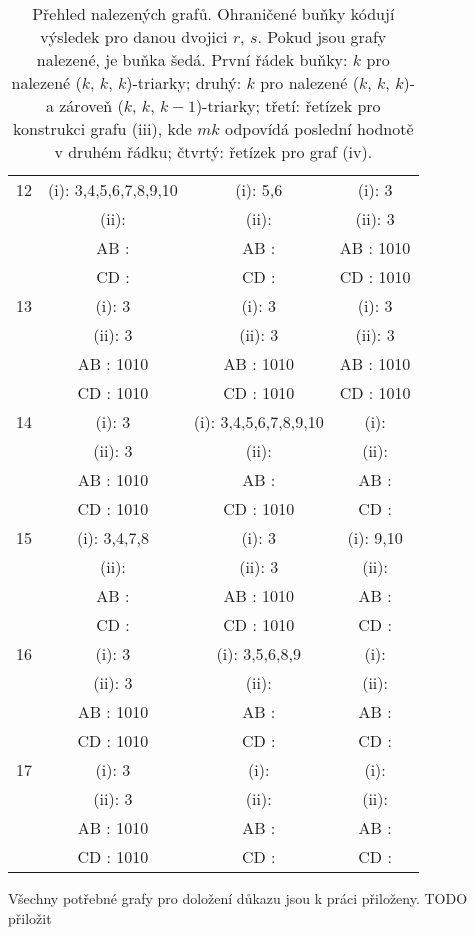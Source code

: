 \begin{table}[h]
\begin{tabular}{| c || c | c | c |}
12 & (i): 3,4,5,6,7,8,9,10 & (i): 5,6 & \cellcolor{lightgray}(i): 3\\
 & (ii):  & (ii):  & \cellcolor{lightgray}(ii): 3\\
 & AB :  & AB :  & \cellcolor{lightgray}AB : 1010\\
 & CD :  & CD :  & \cellcolor{lightgray}CD : 1010\\\hline

13 & \cellcolor{lightgray}(i): 3 & \cellcolor{lightgray}(i): 3 & \cellcolor{lightgray}(i): 3\\
 & \cellcolor{lightgray}(ii): 3 & \cellcolor{lightgray}(ii): 3 & \cellcolor{lightgray}(ii): 3\\
 & \cellcolor{lightgray}AB : 1010 & \cellcolor{lightgray}AB : 1010 & \cellcolor{lightgray}AB : 1010\\
 & \cellcolor{lightgray}CD : 1010 & \cellcolor{lightgray}CD : 1010 & \cellcolor{lightgray}CD : 1010\\\hline

14 & \cellcolor{lightgray}(i): 3 & (i): 3,4,5,6,7,8,9,10 & (i): \\
 & \cellcolor{lightgray}(ii): 3 & (ii):  & (ii): \\
 & \cellcolor{lightgray}AB : 1010 & AB :  & AB : \\
 & \cellcolor{lightgray}CD : 1010 & CD : 1010 & CD : \\\hline

15 & (i): 3,4,7,8 & \cellcolor{lightgray}(i): 3 & (i): 9,10\\
 & (ii):  & \cellcolor{lightgray}(ii): 3 & (ii): \\
 & AB :  & \cellcolor{lightgray}AB : 1010 & AB : \\
 & CD :  & \cellcolor{lightgray}CD : 1010 & CD : \\\hline

16 & \cellcolor{lightgray}(i): 3 & (i): 3,5,6,8,9 & (i): \\
 & \cellcolor{lightgray}(ii): 3 & (ii):  & (ii): \\
 & \cellcolor{lightgray}AB : 1010 & AB :  & AB : \\
 & \cellcolor{lightgray}CD : 1010 & CD :  & CD : \\\hline

17 & \cellcolor{lightgray}(i): 3 & (i):  & (i): \\
 & \cellcolor{lightgray}(ii): 3 & (ii):  & (ii): \\
 & \cellcolor{lightgray}AB : 1010 & AB :  & AB : \\
 & \cellcolor{lightgray}CD : 1010 & CD :  & CD : \\\hline

\end{tabular}
\caption{Přehled nalezených grafů. Ohraničené buňky kódují výsledek pro danou dvojici $r$, $s$. Pokud jsou grafy nalezené, je buňka šedá. První řádek buňky: $k$ pro nalezené ($k$, $k$, $k$)-triarky; druhý: $k$ pro nalezené ($k$, $k$, $k$)- a zároveň ($k$, $k$, $k-1$)-triarky; třetí: řetízek pro konstrukci grafu (iii), kde $mk$ odpovídá poslední hodnotě v druhém řádku; čtvrtý: řetízek pro graf (iv).}
\label{obr03:tabvysledkycele}
\end{table}

Všechny potřebné grafy pro doložení důkazu jsou k práci přiloženy. TODO přiložit